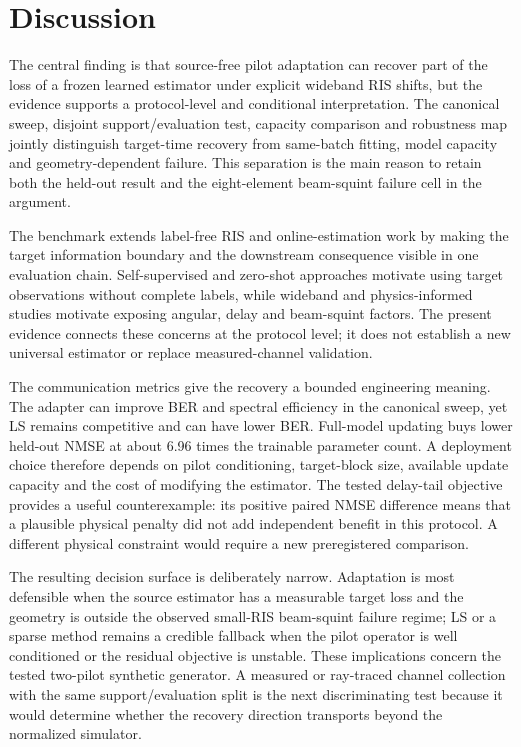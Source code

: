 \documentclass[10pt,twocolumn]{article}
\begin{document}


\section{Discussion}

The central finding is that source-free pilot adaptation can recover part of the loss of a frozen learned estimator under explicit wideband RIS shifts, but the evidence supports a protocol-level and conditional interpretation. The canonical sweep, disjoint support/evaluation test, capacity comparison and robustness map jointly distinguish target-time recovery from same-batch fitting, model capacity and geometry-dependent failure. This separation is the main reason to retain both the held-out result and the eight-element beam-squint failure cell in the argument.

The benchmark extends label-free RIS and online-estimation work by making the target information boundary and the downstream consequence visible in one evaluation chain. Self-supervised and zero-shot approaches motivate using target observations without complete labels, while wideband and physics-informed studies motivate exposing angular, delay and beam-squint factors. The present evidence connects these concerns at the protocol level; it does not establish a new universal estimator or replace measured-channel validation.

The communication metrics give the recovery a bounded engineering meaning. The adapter can improve BER and spectral efficiency in the canonical sweep, yet LS remains competitive and can have lower BER. Full-model updating buys lower held-out NMSE at about 6.96 times the trainable parameter count. A deployment choice therefore depends on pilot conditioning, target-block size, available update capacity and the cost of modifying the estimator. The tested delay-tail objective provides a useful counterexample: its positive paired NMSE difference means that a plausible physical penalty did not add independent benefit in this protocol. A different physical constraint would require a new preregistered comparison.

The resulting decision surface is deliberately narrow. Adaptation is most defensible when the source estimator has a measurable target loss and the geometry is outside the observed small-RIS beam-squint failure regime; LS or a sparse method remains a credible fallback when the pilot operator is well conditioned or the residual objective is unstable. These implications concern the tested two-pilot synthetic generator. A measured or ray-traced channel collection with the same support/evaluation split is the next discriminating test because it would determine whether the recovery direction transports beyond the normalized simulator.
\end{document}
